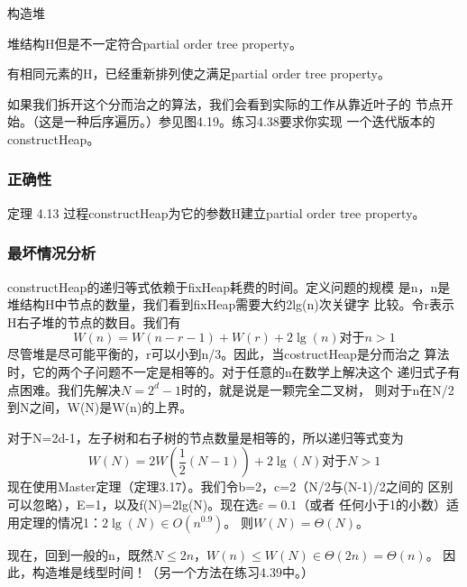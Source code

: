 \begin{algorithm}
构造堆

堆结构H但是不一定符合partial order tree property。

有相同元素的H，已经重新排列使之满足partial order tree property。
\end{algorithm}
如果我们拆开这个分而治之的算法，我们会看到实际的工作从靠近叶子的
节点开始。（这是一种后序遍历。）参见图4.19。练习4.38要求你实现
一个迭代版本的constructHeap。

\subsubsection{正确性}
定理 4.13 过程constructHeap为它的参数H建立partial order tree property。

\subsubsection{最坏情况分析}
constructHeap的递归等式依赖于fixHeap耗费的时间。定义问题的规模
是n，n是堆结构H中节点的数量，我们看到fixHeap需要大约2lg(n)次关键字
比较。令r表示H右子堆的节点的数目。我们有
\begin{displaymath}
W(n)=W(n-r-1)+W(r)+2\lg(n)  \mbox{对于} n>1
\end{displaymath}
尽管堆是尽可能平衡的，r可以小到n/3。因此，当costructHeap是分而治之
算法时，它的两个子问题不一定是相等的。对于任意的n在数学上解决这个
递归式子有点困难。我们先解决$N=2^d-1$时的，就是说是一颗完全二叉树，
则对于n在N/2到N之间，W(N)是W(n)的上界。

对于N=2d-1，左子树和右子树的节点数量是相等的，所以递归等式变为
\begin{displaymath}
W(N)=2W(\frac{1}{2}(N-1))+2\lg(N)  \mbox{对于} N>1
\end{displaymath}
现在使用Master定理（定理3.17）。我们令b=2，c=2（N/2与(N-1)/2之间的
区别可以忽略），E=1，以及f(N)=2lg(N)。现在选$\varepsilon=0.1$（或者
任何小于1的小数）适用定理的情况1：$2\lg(N)\in O(n^{0.9})$。
则$W(N)=\Theta(N)$。

现在，回到一般的n，既然$N\leq 2n$，$W(n)\leq W(N)\in \Theta(2n)=\Theta(n)$。
因此，构造堆是线型时间！（另一个方法在练习4.39中。）


